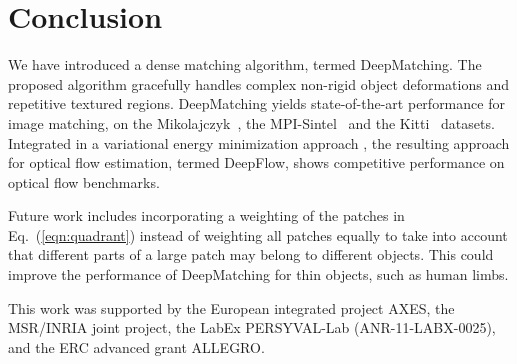 \documentclass[twocolumn,natbib]{svjour3}
\def\eq{Eq.~}
\newcommand{\refp}[1]{(\ref{#1})}
\begin{document}
 
\section{Conclusion}

We have introduced  a dense matching algorithm, termed DeepMatching. 
The proposed algorithm gracefully handles complex non-rigid 
object deformations and repetitive textured regions. 
DeepMatching yields state-of-the-art performance for image matching,
 on the Mikolajczyk~\citep{Mikolajczyk2005}, the MPI-Sintel~\citep{sintel} 
 and the Kitti~\citep{kitti} datasets.
Integrated in a variational energy minimization approach \citep{Bro11a}, 
the resulting approach for optical flow estimation, termed DeepFlow,
shows competitive performance on optical flow benchmarks.


Future work includes incorporating a weighting of the patches in \eq\refp{eqn:quadrant} instead of 
weighting all patches equally to take into account that
different parts of a large patch may belong to different objects.
This could improve the performance of DeepMatching for thin objects, such as human limbs.

\begin{acknowledgements}
This work was supported by the European
integrated project AXES, the MSR/INRIA joint project, the LabEx PERSYVAL-Lab
(ANR-11-LABX-0025), and the ERC advanced grant ALLEGRO.
\end{acknowledgements}
\end{document}
